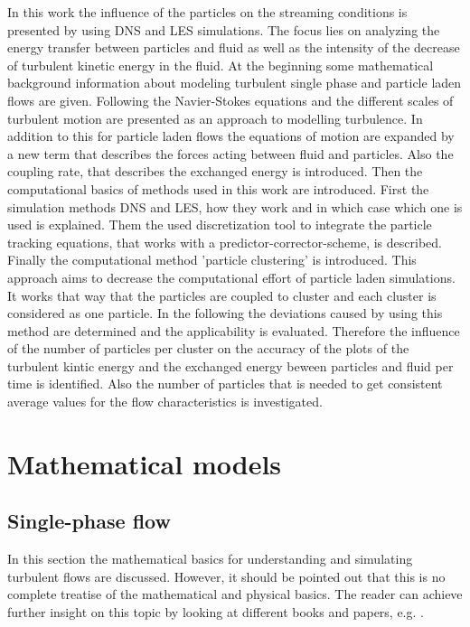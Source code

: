 \documentclass[11pt,a4paper,openany,oneside,parskip=half*]{article}
\begin{document}
\newline
In this work the influence of the particles on the streaming conditions is presented by using DNS and LES simulations. The focus lies on analyzing the energy transfer between particles and fluid as well as the intensity of the decrease of turbulent kinetic energy in the fluid.  
At the beginning some mathematical background information about modeling turbulent single phase and particle laden flows are given. 
Following the Navier-Stokes equations and the different scales of turbulent motion are presented as an approach to modelling turbulence. In addition to this for particle laden flows the equations of motion are expanded by a new term that describes the forces acting between fluid and particles. 
Also the coupling rate, that describes the exchanged energy is introduced.
Then the computational basics of methods used in this work are introduced. First the simulation methods DNS and LES, how they work and in which case which one is used is explained.
Them the used discretization tool to integrate the particle tracking equations, that works with a predictor-corrector-scheme, is described.     
Finally the computational method 'particle clustering' is introduced. This approach aims to decrease the computational effort of particle laden simulations. It works that way that the particles are coupled to cluster and each cluster is considered as one particle.
\newline
In the following the deviations caused by using this method are determined and the applicability is evaluated. Therefore the influence of the number of particles per cluster on the accuracy of the plots of the turbulent kintic energy and the exchanged energy beween particles and fluid per time is identified.
Also the number of particles that is needed to get consistent average values for the flow characteristics is investigated.
\pagebreak
\section{Mathematical models}
\subsection{Single-phase flow} %
In this section the mathematical basics for understanding and simulating turbulent flows are discussed. However, it should be pointed out that this is no
complete treatise of the mathematical and physical basics. The reader can achieve further insight on this topic by looking at different books and papers, 
e.g. \cite{turbulentFlows}.
\newline
\end{document}
